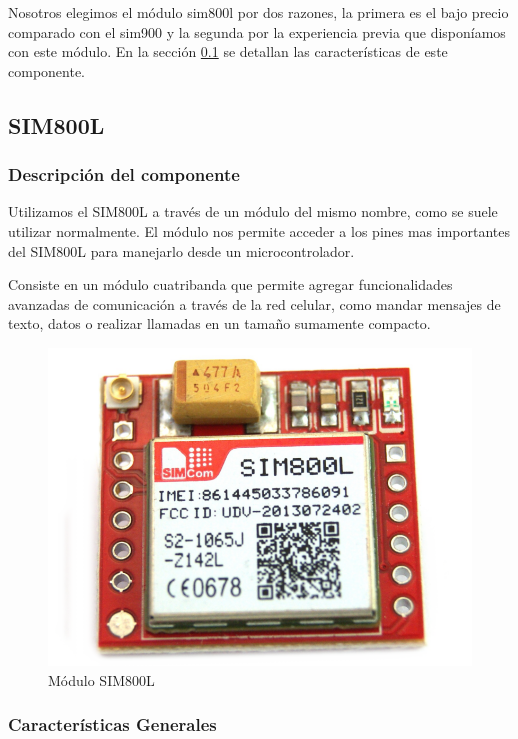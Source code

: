 Nosotros elegimos el módulo sim800l por dos razones, la primera es el bajo precio comparado con el sim900 y la segunda por la experiencia previa
que disponíamos con este módulo.
En la sección \ref{cap:sim800l} se detallan las características de este componente.


\subsection{SIM800L} \label{cap:sim800l}

\subsubsection{Descripción del componente}

Utilizamos el SIM800L a través de un módulo del mismo nombre, como se suele utilizar normalmente. El módulo nos permite acceder a los pines 
mas importantes del SIM800L para manejarlo desde un microcontrolador.\par
Consiste en un módulo cuatribanda que permite agregar funcionalidades avanzadas de comunicación a través de la red celular, como mandar mensajes de texto,
datos o realizar llamadas en un tamaño sumamente compacto. 

\begin{figure}[htb]
	\centering
	\includegraphics[scale=0.2]{images/sim800l.png}
    \caption{Módulo SIM800L}
	\label{fig:sim800l}
\end{figure}

\subsubsection{Características Generales}

